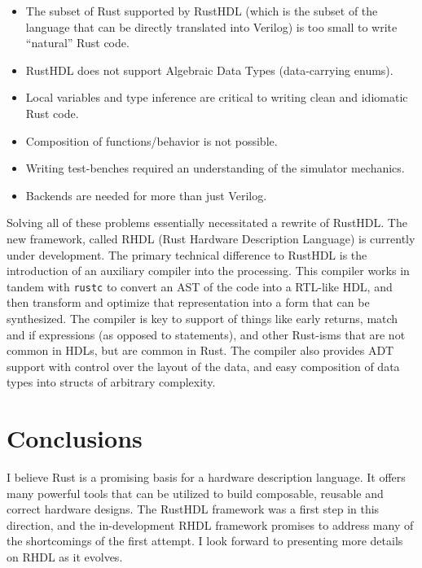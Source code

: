 \documentclass[sigplan,screen,sigconf]{acmart}
\begin{document}
\begin{itemize}
  \item The subset of Rust supported by RustHDL (which is the subset of the language that can be 
  directly translated into Verilog) is too small to write ``natural'' Rust code. 
  \item RustHDL does not support Algebraic Data Types (data-carrying enums).
  \item Local variables and type inference are critical to writing clean and
  idiomatic Rust code.  
  \item Composition of functions/behavior is not possible. 
  \item Writing test-benches required an understanding of the simulator mechanics.
  \item Backends are needed for more than just Verilog.
\end{itemize}

Solving all of these problems essentially necessitated a rewrite of RustHDL.  The new framework,
called RHDL (Rust Hardware Description Language) is currently under development.  The primary
technical difference to RustHDL is the introduction of an auxiliary compiler into the processing.
This compiler works in tandem with \verb|rustc| to convert an AST of the code into a RTL-like
HDL, and then transform and optimize that representation into a form that can be synthesized.  The 
compiler is key to support of things like early returns, match and if expressions (as opposed to statements),
and other Rust-isms that are not common in HDLs, but are common in Rust.  The compiler also provides
ADT support with control over the layout of the data, and easy composition of data types into structs
of arbitrary complexity.  

\section{Conclusions}
I believe Rust is a promising basis for a hardware description language.  It offers many powerful tools
that can be utilized to build composable, reusable and correct hardware designs.  The RustHDL framework
was a first step in this direction, and the in-development RHDL framework promises to address many of the
shortcomings of the first attempt. I look forward to presenting more details on RHDL as it evolves.
\end{document}
